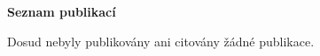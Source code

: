 \documentclass[10pt,a4paper]{article}
\begin{document}
   \begin{center}
   \begin{huge}
\bf Seznam publikací\\[2cm]
\end{huge}
\end{center} 
    

    Dosud nebyly publikovány ani citovány žádné publikace.
    

    
\end{document}
